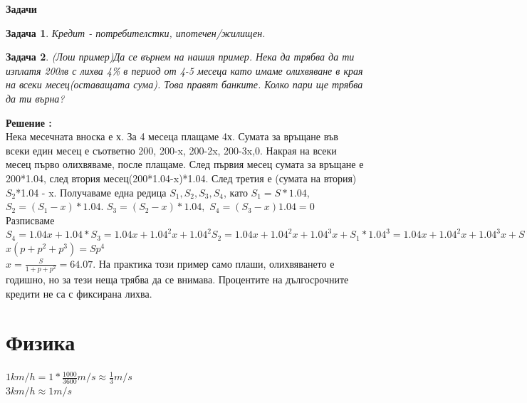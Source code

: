 \documentclass{article}
\newtheorem{problem}{Задача}
\newcounter{solution}
\newcommand\solution{%
	\stepcounter{solution}%
	\textbf{Решение :}\\%
}
\begin{document}
\textbf{Задачи}
\begin{problem}
	Кредит - потребителстки, ипотечен/жилищен.

\end{problem}
\begin{problem}
	
	(Лош пример)Да се върнем на нашия пример. Нека да трябва да ти изплатя 200лв с лихва 4\% в период от 4-5 месеца като имаме олихвяване в края на всеки месец(оставащата сума). Това правят банките. Колко пари ще трябва да ти върна? 
\end{problem}

\solution 
Нека месечната вноска е х. За 4 месеца плащаме 4х. Сумата за връщане във всеки един месец е съответно 200, 200-x, 200-2x, 200-3x,0. Накрая на всеки месец първо олихвяваме, после плащаме. След първия месец сумата за връщане е 200*1.04, след втория месец(200*1.04-x)*1.04. След третия е (сумата на втория)$S_2$*1.04 - x. Получаваме една редица
$S_1, S_2, S_3, S_4 $, като $S_1 = S*1.04$, $S_2 = (S_1-x)*1.04$. $S_3 = (S_2-x)*1.04,$ $ S_4 = (S_3 -x)1.04 = 0 $
Разписваме $S_4 = 1.04x + 1.04*S_3 = 1.04x + 1.04^2x + 1.04^2 S_2 = 1.04x + 1.04^2x + 1.04^3x + S_1*1.04^3 =1.04x + 1.04^2x + 1.04^3x + S*1.04^4 =0  $ \\
$x(p+p^2+p^3) = Sp^4$ \\
$x = \frac{S}{1+p+p^2} = 64.07 $.
На практика този пример само плаши, олихвяването е годишно, но за тези неща трябва да се внимава. Процентите на дългосрочните кредити не са с фиксирана лихва.



\section{Физика}
$1 km/h = 1*\frac{1000}{3600} m/s \approx \frac{1}{3} m/s $ \\
$3 km/h \approx	1 m/s $ 
\end{document}
